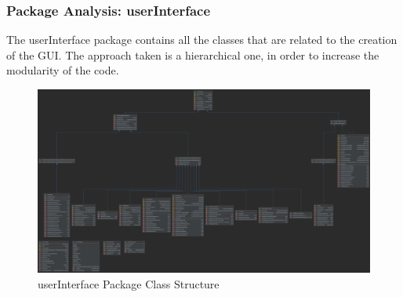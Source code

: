 \subsubsection{Package Analysis: userInterface}
The userInterface package contains all the classes that are related to the creation of the GUI. The approach taken is a hierarchical one, in order to increase the modularity of the code.  
\begin{figure}[H]
	\centering
	\includegraphics[width=\textwidth]{img/userInterface_package.png}
	\caption{userInterface Package Class Structure}
\end{figure}
\begingroup
\setlength{\tabcolsep}{10pt} %
\renewcommand{\arraystretch}{1.5} %
